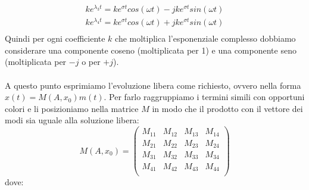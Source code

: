 \begin{displaymath}
\begin{array}{c}
ke^{\lambda_{3}t}=ke^{\sigma t}cos(\omega t)-jke^{\sigma t}sin(\omega t) \\
ke^{\lambda_{4}t}=ke^{\sigma t}cos(\omega t)+jke^{\sigma t}sin(\omega t) \\
\end{array}
\end{displaymath}
Quindi per ogni coefficiente $k$ che moltiplica l'esponenziale complesso dobbiamo considerare una componente coseno (moltiplicata per 1) e una componente seno (moltiplicata per $-j$ o per $+j$). \\ \\
A questo punto esprimiamo l'evoluzione libera come richiesto, ovvero nella forma $x(t)=M(A,x_{0})m(t)$. Per farlo raggruppiamo i termini simili con opportuni colori e li posizioniamo nella matrice $M$ in modo che il prodotto con il vettore dei modi sia uguale alla soluzione libera:
\begin{displaymath}
M(A,x_{0})=\left(\begin{array}{cccc}
M_{11} & M_{12} & M_{13} & M_{14}\\
M_{21} & M_{22} & M_{23} & M_{24}\\
M_{31} & M_{32} & M_{33} & M_{34}\\
M_{41} & M_{42} & M_{43} & M_{44}\\
\end{array}\right)
\end{displaymath}
dove: \\
